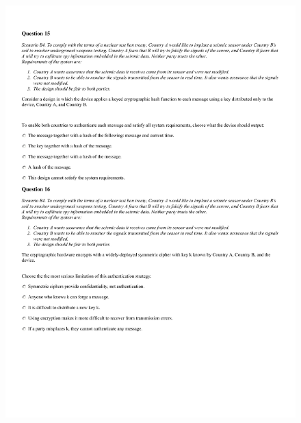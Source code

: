 \begin{figure}[!h]
    \begin{center}
    \advance\leftskip-3cm
    \advance\rightskip-3cm
    \includegraphics[scale=.25]{images/exam/correctly_formated_exam-07.jpg}
    \label{fig:correctly_formated_exam-07}
\end{center}
\end{figure}

